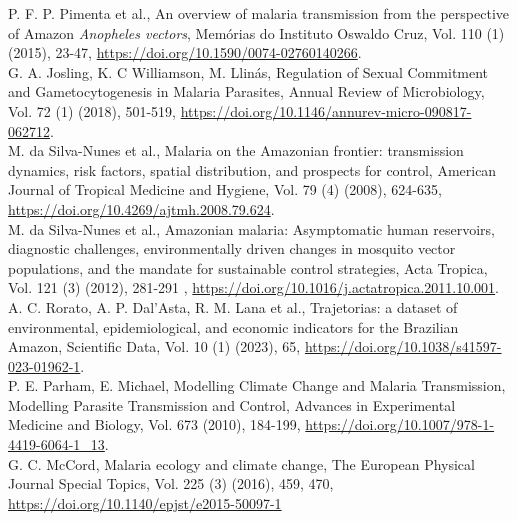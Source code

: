 \documentclass[3p,times]{elsarticle}
\begin{document}
\newpage
 \begin{thebibliography}{00}


 P. F. P. Pimenta et al., An overview of malaria transmission from the perspective of Amazon \emph{Anopheles vectors}, Memórias do Instituto Oswaldo Cruz, Vol. 110 (1) (2015), 23-47, \href{https://doi.org/10.1590/0074-02760140266}{https://doi.org/10.1590/0074-02760140266}.
\\
 G. A. Josling, K. C Williamson, M. Llinás, Regulation of Sexual Commitment and Gametocytogenesis in Malaria Parasites, Annual Review of Microbiology, Vol. 72 (1) (2018), 501-519, \href{https://doi.org/10.1146/annurev-micro-090817-062712}{https://doi.org/10.1146/annurev-micro-090817-062712}.
\\
 M. da Silva-Nunes et al., Malaria on the Amazonian frontier: transmission dynamics, risk factors, spatial distribution, and prospects for control, American Journal of Tropical Medicine and Hygiene, Vol. 79 (4) (2008), 624-635, \href{https://doi.org/10.4269/ajtmh.2008.79.624}{https://doi.org/10.4269/ajtmh.2008.79.624}. 
\\
 M. da Silva-Nunes et al.,  Amazonian malaria: Asymptomatic human reservoirs, diagnostic challenges, environmentally driven changes in mosquito vector populations, and the mandate for sustainable control strategies, Acta Tropica, Vol. 121 (3) (2012), 281-291 , \href{https://doi.org/10.1016/j.actatropica.2011.10.001}{https://doi.org/10.1016/j.actatropica.2011.10.001}.
\\
 A. C. Rorato, A. P. Dal’Asta, R. M. Lana et al., Trajetorias: a dataset of environmental, epidemiological, and economic indicators for the Brazilian Amazon, Scientific Data, Vol. 10 (1) (2023), 65, \href{https://doi.org/10.1038/s41597-023-01962-1}{https://doi.org/10.1038/s41597-023-01962-1}.
\\
 P. E. Parham, E. Michael, Modelling Climate Change and Malaria Transmission, Modelling Parasite Transmission and Control, Advances in Experimental Medicine and Biology, Vol. 673 (2010), 184-199, \href{https://doi.org/10.1007/978-1-4419-6064-1_13}{https://doi.org/10.1007/978-1-4419-6064-1\_13}.
\\
 G. C. McCord, Malaria ecology and climate change, The European Physical Journal Special Topics, Vol. 225 (3) (2016), 459, 470, \href{https://doi.org/10.1140/epjst/e2015-50097-1}{https://doi.org/10.1140/epjst/e2015-50097-1}
\\

\end{thebibliography}
\end{document}
